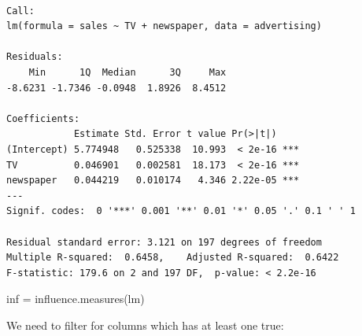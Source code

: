 \documentclass[
  letterpaper,
  DIV=11,
  numbers=noendperiod]{scrreprt}
\newenvironment{Shaded}{\begin{snugshade}}{\end{snugshade}}
\newcommand{\AttributeTok}[1]{\textcolor[rgb]{0.65,0.35,0.00}{#1}}
\newcommand{\ConstantTok}[1]{\textcolor[rgb]{0.85,0.12,0.09}{#1}}
\newcommand{\DecValTok}[1]{\textcolor[rgb]{0.47,0.16,0.63}{#1}}
\newcommand{\FunctionTok}[1]{\textcolor[rgb]{0.02,0.16,0.49}{#1}}
\newcommand{\NormalTok}[1]{\textcolor[rgb]{0.33,0.33,0.33}{#1}}
\newcommand{\OtherTok}[1]{\textcolor[rgb]{0.85,0.12,0.09}{#1}}
\newcommand{\SpecialCharTok}[1]{\textcolor[rgb]{0.00,0.46,0.62}{#1}}
\newcommand{\StringTok}[1]{\textcolor[rgb]{0.00,0.50,0.00}{#1}}
\begin{document}
\begin{verbatim}

Call:
lm(formula = sales ~ TV + newspaper, data = advertising)

Residuals:
    Min      1Q  Median      3Q     Max 
-8.6231 -1.7346 -0.0948  1.8926  8.4512 

Coefficients:
            Estimate Std. Error t value Pr(>|t|)    
(Intercept) 5.774948   0.525338  10.993  < 2e-16 ***
TV          0.046901   0.002581  18.173  < 2e-16 ***
newspaper   0.044219   0.010174   4.346 2.22e-05 ***
---
Signif. codes:  0 '***' 0.001 '**' 0.01 '*' 0.05 '.' 0.1 ' ' 1

Residual standard error: 3.121 on 197 degrees of freedom
Multiple R-squared:  0.6458,    Adjusted R-squared:  0.6422 
F-statistic: 179.6 on 2 and 197 DF,  p-value: < 2.2e-16
\end{verbatim}

\begin{Shaded}
\begin{Highlighting}[]
\NormalTok{inf }\OtherTok{=} \FunctionTok{influence.measures}\NormalTok{(lm)}
\end{Highlighting}
\end{Shaded}

We need to filter for columns which has at least one true:

\begin{Shaded}
\end{Shaded}
\end{document}
